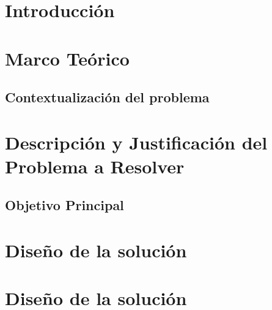 \documentclass{article}
\begin{document}
\section{Introducción}\label{sec:intr}


\section{Marco Teórico}\label{sec:marc}

\subsection{Contextualización del problema}



\section{Descripción y Justificación del Problema a Resolver}\label{sec:descr}


\subsection{Objetivo Principal}



\section{Diseño de la solución}\label{sec:dis}

\section{Diseño de la solución}\label{sec:dis}
\end{document}
